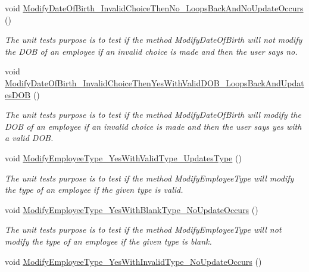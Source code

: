 \begin{DoxyCompactItemize}
void \hyperlink{class_the_company_1_1_tests_1_1_modify_employee_tests_a1f6179228cf046d2e7a3b5f029abbdc0}{Modify\+Date\+Of\+Birth\+\_\+\+Invalid\+Choice\+Then\+No\+\_\+\+Loops\+Back\+And\+No\+Update\+Occurs} ()
\begin{DoxyCompactList}\small\item\em The unit test\textquotesingle{}s purpose is to test if the method Modify\+Date\+Of\+Birth will not modify the D\+O\+B of an employee if an invalid choice is made and then the user says no. \end{DoxyCompactList}\item 
void \hyperlink{class_the_company_1_1_tests_1_1_modify_employee_tests_a65677b18a24c91470dfa9fab7a48113a}{Modify\+Date\+Of\+Birth\+\_\+\+Invalid\+Choice\+Then\+Yes\+With\+Valid\+D\+O\+B\+\_\+\+Loops\+Back\+And\+Updates\+D\+O\+B} ()
\begin{DoxyCompactList}\small\item\em The unit test\textquotesingle{}s purpose is to test if the method Modify\+Date\+Of\+Birth will modify the D\+O\+B of an employee if an invalid choice is made and then the user says yes with a valid D\+O\+B. \end{DoxyCompactList}\item 
void \hyperlink{class_the_company_1_1_tests_1_1_modify_employee_tests_a893ee8f0153022d3d3ff55e0bcbb0e88}{Modify\+Employee\+Type\+\_\+\+Yes\+With\+Valid\+Type\+\_\+\+Updates\+Type} ()
\begin{DoxyCompactList}\small\item\em The unit test\textquotesingle{}s purpose is to test if the method Modify\+Employee\+Type will modify the type of an employee if the given type is valid. \end{DoxyCompactList}\item 
void \hyperlink{class_the_company_1_1_tests_1_1_modify_employee_tests_a6eb51893c13fb986131143bfeb99305d}{Modify\+Employee\+Type\+\_\+\+Yes\+With\+Blank\+Type\+\_\+\+No\+Update\+Occurs} ()
\begin{DoxyCompactList}\small\item\em The unit test\textquotesingle{}s purpose is to test if the method Modify\+Employee\+Type will not modify the type of an employee if the given type is blank. \end{DoxyCompactList}\item 
void \hyperlink{class_the_company_1_1_tests_1_1_modify_employee_tests_a8a9818466ab80a351abc44320f5f3107}{Modify\+Employee\+Type\+\_\+\+Yes\+With\+Invalid\+Type\+\_\+\+No\+Update\+Occurs} ()

\end{DoxyCompactItemize}
